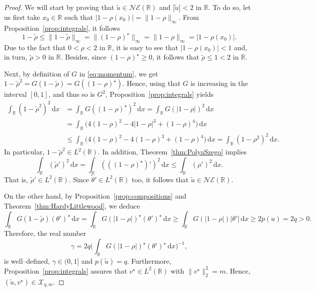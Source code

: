 \documentclass[11pt]{article}
\newcommand{\R}{\mathbb{R}}
\newcommand{\boX}{\mathcal{X}}
\newcommand{\NE}{\mathcal{NE}(\mathbb{R})}
\renewcommand{\d}{\,\mathrm{d}}
\theoremstyle{plain}
\theoremstyle{definition}
\theoremstyle{remark}
\numberwithin{equation}{section}
\begin{document}
{\begin{proof}
    We will start by proving that $\tilde u\in\NE$ and $|\tilde u|<2$ in $\R$. To do so, let us first take $x_0\in\R$ such that $|1-\rho(x_0)|=\|1-\rho\|_\infty$. From Proposition~\ref{prop:integrals}, it follows 
    \[1-\tilde\rho\leq\|1-\tilde\rho\|_\infty=\|(1-\rho)^\star\|_\infty=\|1-\rho\|_\infty=|1-\rho(x_0)|.\]
    Due to the fact that $0<\rho<2$ in $\R$, it is easy to see that $|1-\rho(x_0)|<1$ and, in turn, $\tilde\rho>0$ in $\R$. Besides, since $(1-\rho)^\star\geq 0$, it follows that $\tilde\rho\leq 1<2$ in $\R$. 
    
    Next, by definition of $G$ in \eqref{eq:momentum}, we get $1-\tilde\rho^2=G(1-\tilde\rho)=G((1-\rho)^\star).$ Hence, using that $G$ is increasing in the interval $[0,1]$, and thus so is $G^2$, Proposition~\ref{prop:integrals} yields
    \begin{align*}
        \int_\R(1-\tilde\rho^2)^2\d x&=\int_\R G((1-\rho)^\star)^2 \d x=\int_\R G(|1-\rho|)^2 \d x
        \\
        &=\int_\R\Big(4(1-\rho)^2-4|1-\rho|^3+(1-\rho)^4\Big)\d x
        \\
        &\leq \int_\R\Big(4(1-\rho)^2-4(1-\rho)^3+(1-\rho)^4\Big)\d x=\int_\R (1-\rho^2)^2\d x.
    \end{align*}
    In particular, {$1-\tilde\rho^2\in L^2(\R)$}. In addition, Theorem~\ref{thm:PolyaSzego} implies
    \[\int_\R(\tilde\rho')^2\d x=\int_\R(((1-\rho)^\star)')^2\d x\leq \int_\R(\rho')^2 \d x.\]
    That is, $\tilde\rho'\in L^2(\R)$. Since $\tilde\theta'\in L^2(\R)$ too, it follows that $\tilde u\in\NE$.

    On the other hand, by Proposition~\ref{prop:compositions} and Theorem~\ref{thm:HardyLittlewood}, we deduce
    \begin{equation*}
        \int_\R G(1-\tilde\rho)(\theta')^\star \d x=\int_\R G(|1-\rho|)^\star(\theta')^\star \d x\geq \int_\R G(|1-\rho|)|\theta'| \d x\geq 2 p(u)=2q>0.
    \end{equation*}
    Therefore, the real number
    \[\gamma=2q\Big(\int_\R  G(|1-\rho|)^\star (\theta')^\star \d x\Big)^{-1},\]
    is well--defined, $\gamma\in (0,1]$ and $p(\tilde u)=q$.
    Furthermore, Proposition~\ref{prop:integrals} assures that $v^\star\in L^2(\R)$ with $\|v^\star\|_2^2=m$. Hence, $(\tilde u,v^\star)\in\boX_{q,m}$. 
    

\end{proof}}
\end{document}
